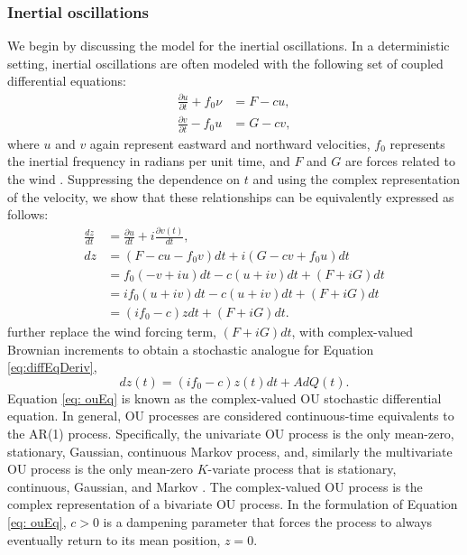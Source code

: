 \documentclass{stat572Style}
\begin{document}
\subsubsection{Inertial oscillations}
We begin by discussing the model for the inertial oscillations. 
In a deterministic setting, inertial oscillations are often modeled with the following set of coupled differential equations:
\begin{align}
\label{eq: deterOsc}
\frac{\partial u }{\partial t}  + f_{0} \nu &= F - cu,\\ \nonumber
\frac{\partial v}{\partial t} - f_{0}u &= G - cv,
\end{align}
where $u$ and $v$ again represent eastward and northward velocities, $f_{0}$ represents the inertial frequency in radians per unit time, and $F$ and $G$ are forces related to the wind  \citep{Pollard1970}. 
Suppressing the dependence on $t$ and using the complex representation of the velocity,  we show that these relationships can be equivalently expressed as follows:
\begin{align}
\label{eq:diffEqDeriv}
\nonumber
\frac{dz}{dt} &= \frac{\partial u}{dt} + i\frac{\partial v(t)}{dt}, \\ \nonumber
dz &= (F - c u- f_{0}v)dt + i(G - cv + f_{0}u)dt\\ \nonumber
&= f_{0}(-v + iu)dt - c(u + iv)dt + (F + iG)dt\\ \nonumber
&= if_{0}(u + iv)dt - c(u + iv)dt + (F + iG)dt\\ 
&= (if_{0} - c)z dt + (F + iG)dt. 
\end{align}
\citet{Sykulski2016} further replace the wind forcing term, $(F + iG)dt$,  with complex-valued Brownian increments \citep{Mandelbrot1968} to obtain a stochastic analogue for Equation \ref{eq:diffEqDeriv},
 \begin{equation}
\label{eq: ouEq}
dz(t) = (i f_{0} -c) z(t) dt + A d Q(t). 
\end{equation}  
Equation \eqref{eq: ouEq}  is known as the complex-valued OU stochastic differential equation. 
In general,  OU processes are considered continuous-time equivalents to the AR(1) process. Specifically,  the univariate OU process is the only mean-zero, stationary, Gaussian, continuous Markov process, and, similarly the multivariate OU process is the only mean-zero $K$-variate process that is stationary, continuous, Gaussian, and Markov \citep{Schach1971}.
 The complex-valued OU process is the complex representation of a bivariate OU process.  
 In the formulation of Equation \eqref{eq: ouEq}, $c > 0$ is a dampening parameter that forces the process to always eventually return to its mean position, $z = 0$.  
\end{document}
